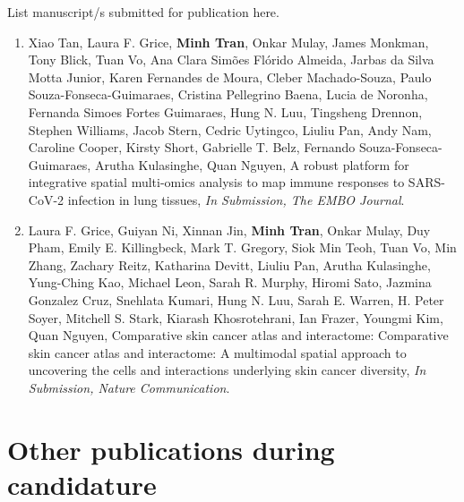\begin{instructional}
	List manuscript/s submitted for publication here. 
    
    \begin{enumerate}

    \item Xiao Tan, Laura F. Grice, \textbf{Minh Tran}, Onkar Mulay, James Monkman, Tony Blick, Tuan Vo, Ana Clara Simões Flórido Almeida, Jarbas da Silva Motta Junior, Karen Fernandes de Moura, Cleber Machado-Souza, Paulo Souza-Fonseca-Guimaraes, Cristina Pellegrino Baena, Lucia de Noronha, Fernanda Simoes Fortes Guimaraes, Hung N. Luu, Tingsheng Drennon, Stephen Williams, Jacob Stern, Cedric Uytingco, Liuliu Pan, Andy Nam, Caroline Cooper, Kirsty Short, Gabrielle T. Belz, Fernando Souza-Fonseca-Guimaraes, Arutha Kulasinghe, Quan Nguyen, A robust platform for integrative spatial multi-omics analysis to map immune responses to SARS-CoV-2 infection in lung tissues, \textit{In Submission, The EMBO Journal}.
    
    \item Laura F. Grice, Guiyan Ni, Xinnan Jin, \textbf{Minh Tran}, Onkar Mulay, Duy Pham, Emily E. Killingbeck, Mark T. Gregory, Siok Min Teoh, Tuan Vo, Min Zhang, Zachary Reitz, Katharina Devitt, Liuliu Pan, Arutha Kulasinghe, Yung-Ching Kao, Michael Leon, Sarah R. Murphy, Hiromi Sato, Jazmina Gonzalez Cruz, Snehlata Kumari, Hung N. Luu, Sarah E. Warren, H. Peter Soyer, Mitchell S. Stark, Kiarash Khosrotehrani, Ian Frazer, Youngmi Kim, Quan Nguyen, Comparative skin cancer atlas and interactome: Comparative skin cancer atlas and interactome: A multi\-modal spatial approach to uncovering the cells and interactions underlying skin cancer diversity, \textit{In Submission, Nature Communication}.
    \end{enumerate}
\end{instructional}





\section*{Other publications during candidature}

